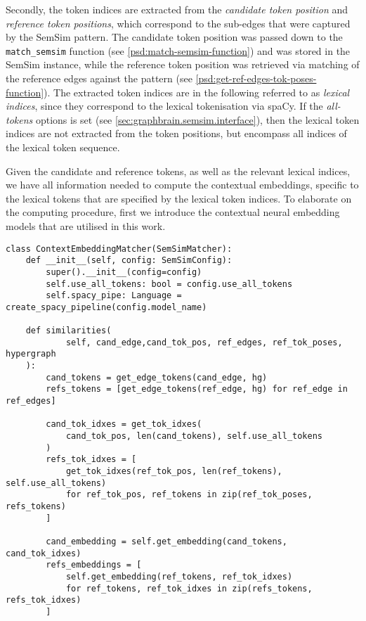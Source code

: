 \documentclass[11pt]{scrreprt}
\begin{document}
{Secondly, the token indices are extracted from the \textit{candidate token position} and \textit{reference token positions}, which correspond to the sub-edges that were captured by the SemSim pattern. The candidate token position was passed down to the \texttt{match\_semsim} function (see \cref{psd:match-semsim-function}) and was stored in the SemSim instance, while the reference token position was retrieved via matching of the reference edges against the pattern (see \cref{psd:get-ref-edges-tok-poses-function}). The extracted token indices are in the following referred to as \textit{lexical indices}, since they correspond to the lexical tokenisation via spaCy. If the \textit{all-tokens} options is set (see \cref{sec:graphbrain.semsim.interface}), then the lexical token indices are not extracted from the token positions, but encompass all indices of the lexical token sequence.

Given the candidate and reference tokens, as well as the relevant lexical indices, we have all information needed to compute the contextual embeddings, specific to the lexical tokens that are specified by the lexical token indices. To elaborate on the computing procedure, first we introduce the contextual neural embedding models that are utilised in this work.

\begin{pseudo}[p!]
\begin{lstlisting}
class ContextEmbeddingMatcher(SemSimMatcher):
    def __init__(self, config: SemSimConfig):
        super().__init__(config=config)
        self.use_all_tokens: bool = config.use_all_tokens
        self.spacy_pipe: Language = create_spacy_pipeline(config.model_name)

    def similarities(
            self, cand_edge,cand_tok_pos, ref_edges, ref_tok_poses, hypergraph
    ):
        cand_tokens = get_edge_tokens(cand_edge, hg)
        refs_tokens = [get_edge_tokens(ref_edge, hg) for ref_edge in ref_edges]

        cand_tok_idxes = get_tok_idxes(
            cand_tok_pos, len(cand_tokens), self.use_all_tokens
        )
        refs_tok_idxes = [
            get_tok_idxes(ref_tok_pos, len(ref_tokens), self.use_all_tokens)
            for ref_tok_pos, ref_tokens in zip(ref_tok_poses, refs_tokens)
        ]
        
        cand_embedding = self.get_embedding(cand_tokens, cand_tok_idxes)
        refs_embeddings = [
            self.get_embedding(ref_tokens, ref_tok_idxes)
            for ref_tokens, ref_tok_idxes in zip(refs_tokens, refs_tok_idxes)
        ]
        

\end{lstlisting}
\end{pseudo}}
\end{document}
